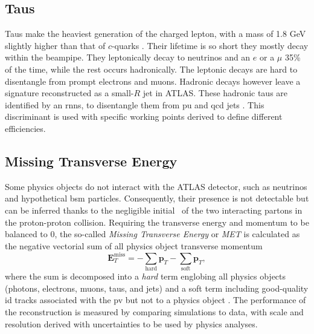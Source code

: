 \subsection{Taus}
Taus make the heaviest generation of the charged lepton, with a mass of 1.8 GeV slightly higher than that of $c$-quarks \cite{Tanabashi:2018oca}. Their lifetime is so short they mostly decay within the beampipe. They leptonically decay to neutrinos and an $e$ or a $\mu$ 35\% of the time, while the rest occurs hadronically. The leptonic decays are hard to disentangle from prompt electrons and muons. Hadronic decays however leave a signature reconstructed as a small-$R$ jet in ATLAS. These hadronic taus are identified by an \glspl{rnn}, to disentangle them from \gls{pu} and \gls{qcd} jets \cite{ATL-PHYS-PUB-2019-033}. This discriminant is used with specific working points derived to define different efficiencies. 

\subsection{Missing Transverse Energy}
Some physics objects do not interact with the ATLAS detector, such as neutrinos and hypothetical \gls{bsm} particles. Consequently, their presence is not detectable but can be inferred thanks to the negligible initial \pt\ of the two interacting partons in the proton-proton collision. Requiring the transverse energy and momentum to be balanced to 0, the so-called \textit{Missing Transverse Energy \etm} or \textit{MET} is calculated as the negative vectorial sum of all physics object transverse momentum
\begin{equation}
  \boldsymbol{E}_T^{\text{miss}} = - \sum_{\text{hard}} \boldsymbol{p}_T - \sum_{\text{soft}} \boldsymbol{p}_T,
\end{equation}
where the sum is decomposed into a \textit{hard} term englobing all physics objects (photons, electrons, muons, taus, and jets) and a soft term including good-quality \gls{id} tracks associated with the \gls{pv} but not to a physics object \cite{ATLASmetReco}. The performance of the reconstruction is measured by comparing simulations to data, with scale and resolution derived with uncertainties to be used by physics analyses. 